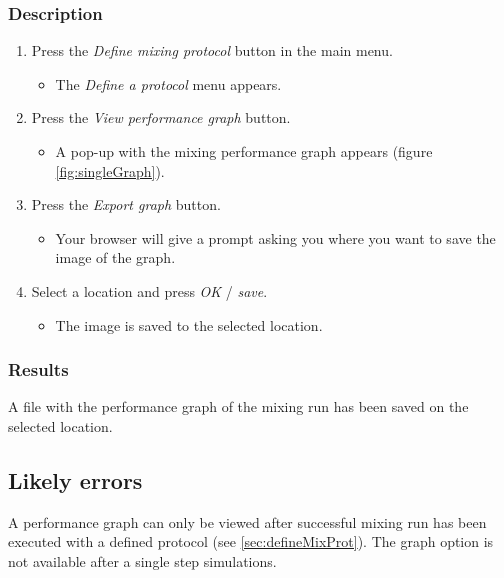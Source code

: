 \subsubsection{Description}
\begin{enumerate}
	\item  Press the \emph{Define mixing protocol} button in the main menu.
		\begin{itemize}
            		\item The \emph{Define a protocol} menu appears.
		\end{itemize}
			\item Press the \emph{View performance graph} button.
		\begin{itemize}
            		\item A pop-up with the mixing performance graph appears (figure \ref{fig:singleGraph}).
		\end{itemize}


    \item Press the \emph{Export graph} button.
		\begin{itemize}
             \item Your browser will give a prompt asking you where you want to save the image of the graph.
		\end{itemize}
    \item  Select a location and press \emph{OK} / \emph{save}.
		\begin{itemize}
           \item The image is saved to the selected location.
		\end{itemize}
\end{enumerate}

\subsubsection{Results}
A file with the performance graph of the mixing run has been saved on the selected location.

\subsection{Likely errors}
A performance graph can only be viewed after successful mixing run has been executed with a defined protocol (see \ref{sec:defineMixProt}). The graph option is not available after a single step simulations.


